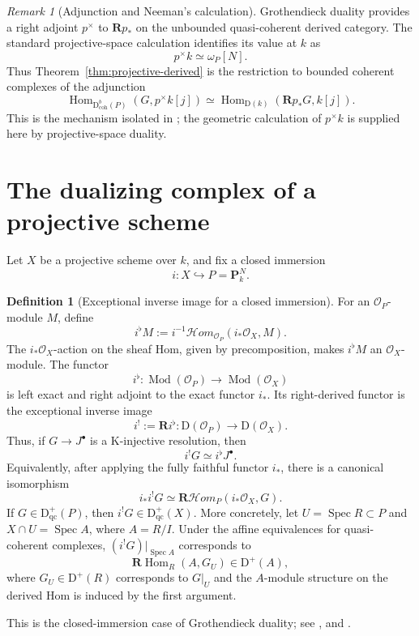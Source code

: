 \documentclass[11pt,a4paper]{article}
\theoremstyle{definition}
\newtheorem{definition}[theorem]{Definition}
\theoremstyle{remark}
\newtheorem{remark}[theorem]{Remark}
\newcommand{\OO}{\mathcal O}
\newcommand{\PP}{\mathbf P}
\newcommand{\Spec}{\operatorname{Spec}}
\newcommand{\Hom}{\operatorname{Hom}}
\newcommand{\shHom}{\mathcal H\!om}
\newcommand{\RHom}{\mathbf R\!\operatorname{Hom}}
\newcommand{\RshHom}{\mathbf R\!\mathcal H\!om}
\newcommand{\D}{\mathrm D}
\newcommand{\Dbcoh}{\mathrm D^b_{\mathrm{coh}}}
\begin{document}
\begin{remark}[Adjunction and Neeman's calculation]
Grothendieck duality provides a right adjoint $p^\times$ to $\mathbf Rp_*$ on
the unbounded quasi-coherent derived category. The standard projective-space
calculation identifies its value at $k$ as
\[
  p^\times k\simeq\omega_P[N].
\]
Thus Theorem~\ref{thm:projective-derived} is the restriction to bounded
coherent complexes of the adjunction
\[
  \Hom_{\Dbcoh(P)}(G,p^\times k[j])
  \simeq\Hom_{\D(k)}(\mathbf Rp_*G,k[j]).
\]
This is the mechanism isolated in \cite[Section 3.3]{NeemanSimple}; the
geometric calculation of $p^\times k$ is supplied here by projective-space
duality.
\end{remark}

\section{The dualizing complex of a projective scheme}

Let $X$ be a projective scheme over $k$, and fix a closed immersion
\[
  i:X\hookrightarrow P=\PP^N_k.
\]

\begin{definition}[Exceptional inverse image for a closed immersion]
\label{def:closed-immersion-shriek}
For an $\OO_P$-module $M$, define
\[
  i^\flat M
  :=i^{-1}\shHom_{\OO_P}(i_*\OO_X,M).
\]
The $i_*\OO_X$-action on the sheaf Hom, given by precomposition, makes
$i^\flat M$ an $\OO_X$-module. The functor
\[
  i^\flat:\operatorname{Mod}(\OO_P)\longrightarrow
  \operatorname{Mod}(\OO_X)
\]
is left exact and right adjoint to the exact functor $i_*$. Its right-derived
functor is the exceptional inverse image
\[
  i^!:=\mathbf R i^\flat:
  \D(\OO_P)\longrightarrow\D(\OO_X).
\]
Thus, if $G\to J^\bullet$ is a K-injective resolution, then
\[
  i^!G\simeq i^\flat J^\bullet.
\]
Equivalently, after applying the fully faithful functor $i_*$, there is a
canonical isomorphism
\[
  i_*i^!G\simeq\RshHom_P(i_*\OO_X,G).
\]
If $G\in\D^+_{\mathrm{qc}}(P)$, then
$i^!G\in\D^+_{\mathrm{qc}}(X)$. More concretely, let
$U=\Spec R\subset P$ and $X\cap U=\Spec A$, where $A=R/I$. Under the affine
equivalences for quasi-coherent complexes, $(i^!G)|_{\Spec A}$ corresponds to
\[
  \RHom_R(A,G_U)\in\D^+(A),
\]
where $G_U\in\D^+(R)$ corresponds to $G|_U$ and the $A$-module structure on
the derived Hom is induced by the first argument.
\end{definition}

This is the closed-immersion case of Grothendieck duality; see
\cite[Tags 0A76, 0A78, and 0A9X]{Stacks}, and
\cite[Equation (4.9.4.1)]{LipmanNotes}.
\end{document}

